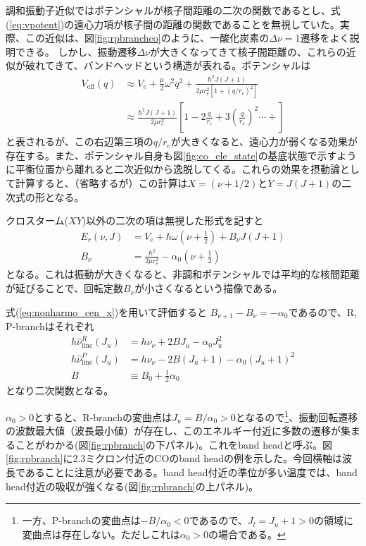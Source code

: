 調和振動子近似ではポテンシャルが核子間距離の二次の関数であるとし、式(\ref{eq:vpotent})の遠心力項が核子間の距離の関数であることを無視していた。実際、この近似は、図\ref{fig:rpbranchco}のように、一酸化炭素の$\Delta \nu=1$遷移をよく説明できる。
しかし、振動遷移$\Delta \nu$が大きくなってきて核子間距離の、これらの近似が破れてきて、バンドヘッドという構造が表れる。ポテンシャルは
\begin{align}
\label{eq:vpotent_}
V_\mathrm{eff} (q) &\approx V_e + \frac{\mu}{2} \omega^2 q^2 + \frac{\hbar^2 J(J+1)}{2 \mu r_e^2 [1 + (q/r_e)^2]} \\
&\approx \frac{\hbar^2 J (J+1)}{2 \mu r_e^2} \left[1 - 2 \frac{q}{r_e} + 3 \left(\frac{q}{r_e} \right)^2 \cdots + \right]
\end{align}
と表されるが、この右辺第三項の$q/r_e$が大きくなると、遠心力が弱くなる効果が存在する。また、ポテンシャル自身も図\ref{fig:co_ele_state}の基底状態で示すように平衡位置から離れると二次近似から逸脱してくる。これらの効果を摂動論として計算すると、（省略するが）この計算は$X=(\nu + 1/2)$と$Y=J(J+1)$の二次式の形となる。

クロスターム($XY$)以外の二次の項は無視した形式を記すと
\begin{align}
    \label{eq:nonharmo_cen}
    E_r (\nu, J) &= V_e + \hbar \omega \left( \nu + \frac{1}{2} \right) + B_\nu J (J+1)  \\
    \label{eq:nonharmo_cen_x}
    B_\nu &= \frac{\hbar^2}{2 \mu r_e^2} - \alpha_0  \left( \nu + \frac{1}{2} \right) 
\end{align}
となる。これは振動が大きくなると、非調和ポテンシャルでは平均的な核間距離が延びることで、回転定数$B_\nu$が小さくなるという描像である。

式(\ref{eq:nonharmo_cen_x})を用いて評価すると $B_{\nu+1} - B_\nu = - \alpha_0$であるので、R, P-branchはそれぞれ
\begin{align}
\label{eq:u_fort_R}
    h \hat{\nu}^R_{\mathrm{line}} (J_u) &= h \nu_\nu  + 2 B J_u - \alpha_0 J_u^2  \\
\label{eq:u_fort_P}
    h \hat{\nu}^P_{\mathrm{line}} (J_u) &=  h \nu_\nu - 2 B (J_u + 1) - \alpha_0 (J_u + 1)^2 \\
    B &\equiv B_0 + \frac{1}{2} \alpha_0
\end{align}
となり二次関数となる。

$\alpha_0 > 0$とすると、R-branchの変曲点は$J_u = B/\alpha_0 > 0$となるので\footnote{一方、P-branchの変曲点は$- B/\alpha_0 < 0$であるので、$J_l = J_u+1 > 0$の領域に変曲点は存在しない。ただしこれは$\alpha_0>0$の場合である。}、振動回転遷移の波数最大値（波長最小値）が存在し、このエネルギー付近に多数の遷移が集まることがわかる(図\ref{fig:rpbranch}の下パネル)。これをband headと呼ぶ。図\ref{fig:rpbranch}に2.3ミクロン付近のCOのband headの例を示した。今回横軸は波長であることに注意が必要である。band head付近の準位が多い温度では、band head付近の吸収が強くなる(図\ref{fig:rpbranch}の上パネル)。

